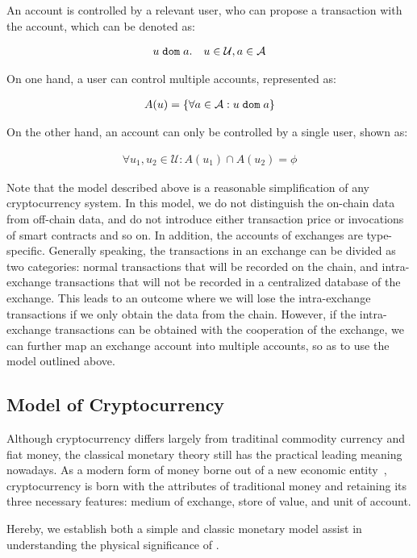 An account is controlled by a relevant user, who can propose a transaction with the account, which can be denoted as:

\begin{align}
u {\; \texttt{dom}\;} a. \quad u\in \mathcal{U}, a\in \mathcal{A}
\end{align}

\noindent On one hand, a user can control multiple accounts, represented as:

\begin{align}
A(u) = \{\forall a\in \mathcal{A} : u {\; \texttt{dom}\;} a\}
\end{align}

\noindent On the other hand, an account can only be controlled by a single user, shown as:

\begin{align}
\forall u_1, u_2 \in \mathcal{U} : A(u_1) \cap A(u_2) = \phi
\end{align}

Note that the model described above is a reasonable simplification of any cryptocurrency system. In this model, we do not distinguish the on-chain data from off-chain data, and do not introduce either transaction price or invocations of smart contracts and so on. In addition, the accounts of exchanges are type-specific. Generally speaking, the transactions in an exchange can be divided as two categories: normal transactions that will be recorded on the chain, and intra-exchange transactions that will not be recorded in a centralized database of the exchange. This leads to an outcome where we will lose the intra-exchange transactions if we only obtain the data from the chain.
However, if the intra-exchange transactions can be obtained with the cooperation of the exchange, we can further map an exchange account into multiple accounts, so as to use the model outlined above.


\subsection{Model of Cryptocurrency}
Although cryptocurrency differs largely from traditinal commodity currency and fiat money, the classical monetary theory still has the practical leading meaning nowadays. As a modern form of money borne out of a new economic entity~\cite{swan2015blockchain}, cryptocurrency is born with the attributes of traditional money and retaining its three necessary features: medium of exchange, store of value, and unit of account.

Hereby, we establish both a simple and classic monetary model assist in understanding the physical significance of \nr.

